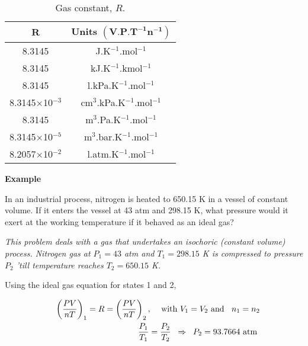    \begin{table}[h]
     \begin{center}
     \begin{tabular}{||c c||}
       \hline\hline
           $\mathbf{R}$   & {\bf Units} $\mathbf{\left(\text{V.P.T}^{-1}\text{n}^{-1}\right)}$ \\
           \hline\hline
           8.3145    &  J.K$^{-1}$.mol$^{-1}$  \\
           8.3145    &  kJ.K$^{-1}$.kmol$^{-1}$  \\
           8.3145    &  l.kPa.K$^{-1}$.mol$^{-1}$  \\
           8.3145$\times$10$^{-3}$    & cm$^{3}$.kPa.K$^{-1}$.mol$^{-1}$  \\
           8.3145    &  m$^{3}$.Pa.K$^{-1}$.mol$^{-1}$  \\
           8.3145$\times$10$^{-5}$    &  m$^{3}$.bar.K$^{-1}$.mol$^{-1}$  \\
           8.2057$\times$10$^{-2}$ &  l.atm.K$^{-1}$.mol$^{-1}$  \\
           \hline\hline           
     \end{tabular}
     \caption{Gas constant, $R$.}\label{Chapter:Intro_Property_of_Gases:Table:RConst}
     \end{center}
   \end{table}
   
   \begin{MyExample}{\begin{center}{\bf Example}\end{center}}
     \begin{example}\label{Chapter:Intro_Property_of_Gases:Example1}
       In an industrial process, nitrogen is heated to 650.15 K in a vessel of constant volume. If it enters the vessel at 43 atm and 298.15 K, what pressure would it exert at the working temperature if it behaved as an ideal gas?

       {\it This problem deals with a gas that undertakes an isochoric (\ie constant volume) process. Nitrogen gas at $P_{1} = 43$ atm and $T_{1} = 298.15$ K is compressed to pressure $P_{2}$ 'till temperature reaches $T_{2} = 650.15$ K.

         Using the ideal gas equation for states 1 and 2,}
       \begin{eqnarray}
         && \left(\displaystyle\frac{PV}{nT}\right)_{1} = R = \left(\displaystyle\frac{PV}{nT}\right)_{2},\;\;\;\text{ with } V_{1}=V_{2} \text{ and }\;\; n_{1}=n_{2}\nonumber \\
         && \displaystyle\frac{P_{1}}{T_{1}} = \displaystyle\frac{P_{2}}{T_{2}} \;\;\Rightarrow \;\; P_{2}= 93.7664 \text{ atm } \nonumber
         \end{eqnarray}
     \end{example}
   \end{MyExample}

